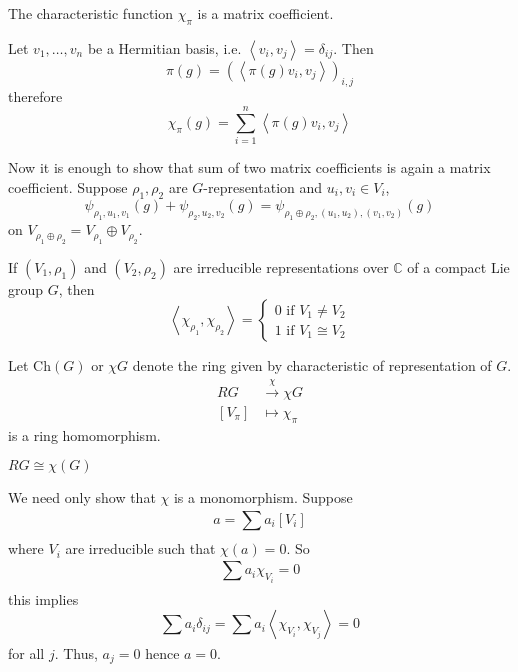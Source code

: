 \documentclass[11pt,a4paper]{scrarticle}
\theoremstyle{definition}
\renewenvironment{proof}[1][\proofname]{\vspace{-10pt}\begin{myproof}}{\end{myproof}}
\theoremstyle{greenbox}
\newcommand{\C}{\mathbb{C}}
\newcommand{\Ch}{\text{Ch}}
\begin{document}
    \begin{lemma}
        The characteristic function $ \chi_{\pi} $ is a matrix coefficient. 
    \end{lemma}
    \begin{proof}
        Let $ v_{1}, \dots , v_{n} $ be a Hermitian basis, i.e. $ \left< v_{i}, v_{j} \right> = \delta_{ij}$. Then 
        \[ \pi(g) = \left( \left< \pi(g)v_{i},v_{j} \right> \right)_{i,j} \]
        therefore 
        \[ \chi_{\pi}(g) = \sum_{i=1}^{n}\left< \pi(g)v_{i},v_{j} \right>  \]
        
        Now it is enough to show that sum of two matrix coefficients is again a matrix coefficient. Suppose $ \rho_{1}, \rho_{2} $ are $ G $-representation and $ u_{i},v_{i} \in V_{i} $, 
        \[ \psi_{\rho_{1},u_{1},v_{1}}(g)+ \psi_{\rho_{2},u_{2},v_{2}}(g) = \psi_{\rho_{1} \oplus \rho_{2}, (u_{1},u_{2}),(v_{1},v_{2})}(g) \]
        on $ V_{\rho_{1} \oplus \rho_{2}} = V_{\rho_{1}} \oplus V_{\rho_{2}} $.
    \end{proof}

    \begin{thm}
        If $ (V_{1}, \rho_{1}) $ and $ (V_{2},\rho_{2}) $ are irreducible representations over $ \C $ of a compact Lie group $ G $, then 
        \[ \left< \chi_{\rho_{1}}, \chi_{\rho_{2}} \right> = \begin{cases}
            0 \text{ if }V_{1} \neq V_{2} \\
            1 \text{ if }V_{1} \cong V_{2}
        \end{cases}\]
        
    \end{thm}
    Let $ \Ch(G) $ or $ \chi G $ denote the ring given by characteristic of representation of $ G $.  \begin{align*}
        RG & \xrightarrow{\chi} \chi G \\
        [V_{\pi}] & \mapsto \chi_{\pi} 
    \end{align*} 
    is a ring homomorphism. 

    \begin{thm}
        $ RG \cong \chi(G) $
    \end{thm}
    \begin{proof}
        We need only show that $ \chi  $ is a monomorphism. Suppose 
        \[ a = \sum_{}^{} a_{i}[V_{i}] \]
        where $ V_{i} $ are irreducible such that $ \chi(a) = 0 $. So 
        \[ \sum_{}^{}a_{i}\chi_{V_{i}} = 0  \]
        this implies 
        \[ \sum_{}^{}a_{i} \delta_{ij} =  \sum_{}^{} a_{i} \left< \chi_{V_{i}}, \chi_{V_{j}} \right>  = 0\]
        for all $ j $. Thus, $ a_{j} = 0 $ hence $ a = 0 $. 
    \end{proof}
\end{document}
